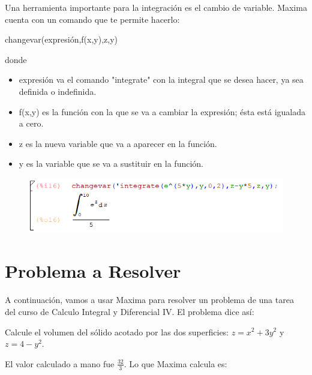 \documentclass[a4paper]{article}
\begin{document}
Una herramienta importante para la integración es el cambio de variable. Maxima cuenta con un comando que te permite hacerlo:
\begin{center}
changevar(expresión,f(x,y),z,y)
\end{center}
donde
\begin{itemize}
\item expresión va el comando "integrate" con la integral que se desea hacer, ya sea definida o indefinida.
\item f(x,y) es la función con la que se va a cambiar la expresión; ésta está igualada a cero.
\item z es la nueva variable que va a aparecer en la función. 
\item y es la variable que se va a sustituir en la función.
\end{itemize}

\begin{figure}[h!]
  \centering
  \includegraphics[width=0.6\linewidth]{changevar_ej.PNG}
\end{figure}

\section{Problema a Resolver}
A continuación, vamos a usar Maxima para resolver un problema de una tarea del curso de Calculo Integral y Diferencial IV. El problema dice así:

Calcule el volumen del sólido acotado por las dos superficies: $z = x^2 + 3y^2$ y $z = 4 - y^2$.

El valor calculado a mano fue $\frac{32}{3}$. Lo que Maxima calcula es:
\end{document}
